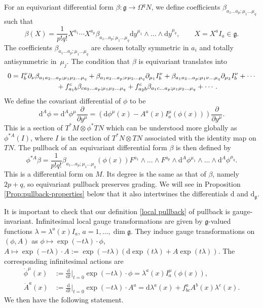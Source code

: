 \documentclass[pdftex]{sigma}
\newcommand{\g}{{\mathfrak{g}}}
\newcommand{\1}{{\mathbb{1}}}
\def \d{\mathrm{d}}
\numberwithin{equation}{section}
\begin{document}
For an equivariant differential form $\beta\colon \g\to\Omega^q N$, we define coefficients $\beta_{a_1\dots a_p;\mu_1\dots\mu_q}$ such that
\begin{equation*}
\beta(X) = \frac{1}{p!q!}X^{a_1}\cdots X^{a_p}\beta_{a_1\dots a_p;\mu_1\dots\mu_q}\d y^{\mu_1}\wedge\dots\wedge\d y^{\mu_q},\qquad X=X^aI_a\in\g.
\end{equation*}
The coefficients $\beta_{a_1\dots a_p;\mu_1\dots\mu_q}$ are chosen totally symmetric in $a_i$ and totally antisymmetric in~$\mu_j$. The condition that $\beta$ is equivariant translates into
\begin{gather}
 0=I_b^\nu\partial_\nu\beta_{a_1a_2\dots a_p;\mu_1\mu_2\dots\mu_q}
+ \beta_{a_1a_2\dots a_p;\nu\mu_2\dots\mu_q}\partial_{\mu_1}I_b^\nu + \beta_{a_1a_2\dots a_p;\mu_1\nu\dots\mu_q}\partial_{\mu_2}I_b^\nu + \cdots \nonumber\\
 \hphantom{0=}{} +f^c_{a_1 b}\beta_{ca_2\dots a_p;\mu_1\mu_2\dots\mu_q}+f^c_{a_2 b}\beta_{a_1c\dots a_p;\mu_1\mu_2\dots\mu_q}+\cdots .\label{Lie derivative}
\end{gather}
We define the covariant differential of $\phi$ to be
\begin{equation}\label{cov-derivative}
\d^A\phi = \d^A\phi^\mu \frac{\partial}{\partial y^\mu} = (\d\phi^\mu(x) -A^a(x)I^\mu_a(\phi(x)))\frac{\partial}{\partial y^\mu}.
\end{equation}
This is a section of $T^\ast M\otimes\phi^\ast TN$ which can be understood more globally as $\phi^{\ast A}(I)$, where $I$ is the section of $T^\ast N\otimes TN$ associated with the identity map on $TN$. The pullback of an~equivariant differential form $\beta$ is then defined by
\begin{equation}\label{local pullback}
\phi^{\ast A}\beta = \frac{1}{p!q!}\beta_{a_1\dots a_p;\mu_1\dots\mu_q}(\phi(x)) F^{a_1}\wedge\dots\wedge F^{a_p}\wedge \d^A\phi^{\mu_1}\wedge\dots\wedge \d^A\phi^{\mu_q}.
\end{equation}
This is a differential form on $M$. Its degree is the same as that of $\beta$, namely $2p+q$, so equivariant pullback preserves grading. We will see in Proposition \ref{Prop:pullback-properties} below that it also intertwines the differentials $\d$ and $\d_\g$.

It is important to check that our definition \eqref{local pullback} of pullback is gauge-invariant. Infinitesimal local gauge transformations are given by $\g$-valued functions $\lambda=\lambda^a(x)I_a$, $a=1,\dots,\dim\g$. They induce gauge transformations on $(\phi,A)$ as $\phi\mapsto\exp(-t\lambda)\cdot \phi$, $A\mapsto\exp(-t\lambda)\cdot A := \exp(-t\lambda)(\d\exp(t\lambda)+A\exp(t\lambda))$. The corresponding infinitesimal actions are
\begin{align}
\dot{\phi}^\mu(x)&:=\frac{\d}{\d t}\Big|_{t=0}\exp(-t\lambda)\cdot \phi = \lambda^a(x)I_a^\mu(\phi(x)), \label{gt phi}\\
\dot{A}^a(x) &:=\frac{\d}{\d t}\Big|_{t=0}\exp(-t\lambda)\cdot A^a= \d\lambda^a(x) + f^a_{bc}A^b(x)\lambda^c(x)\label{gt A}.
\end{align}
We then have the following statement.
\end{document}
